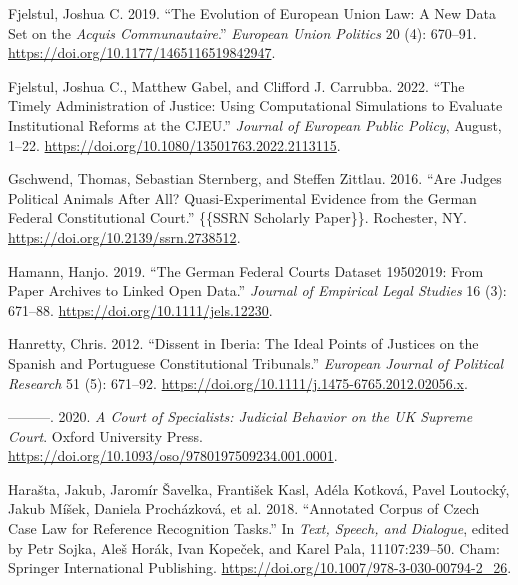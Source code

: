 \documentclass[
  11pt,
]{article}
\newlength{\cslhangindent}
\newenvironment{CSLReferences}[2] %
 {%
  \setlength{\parindent}{0pt}
  \ifodd #1 \everypar{\setlength{\hangindent}{\cslhangindent}}\ignorespaces\fi
  \ifnum #2 > 0
  \setlength{\parskip}{#2\baselineskip}
  \fi
 }%
 {}
\begin{document}
\begin{CSLReferences}{1}{0}
\leavevmode{}%
Fjelstul, Joshua C. 2019. {``The Evolution of {European Union} Law: {A}
New Data Set on the {\emph{Acquis Communautaire}}.''} \emph{European
Union Politics} 20 (4): 670--91.
\url{https://doi.org/10.1177/1465116519842947}.

\leavevmode{}%
Fjelstul, Joshua C., Matthew Gabel, and Clifford J. Carrubba. 2022.
{``The Timely Administration of Justice: Using Computational Simulations
to Evaluate Institutional Reforms at the {CJEU}.''} \emph{Journal of
European Public Policy}, August, 1--22.
\url{https://doi.org/10.1080/13501763.2022.2113115}.

\leavevmode{}%
Gschwend, Thomas, Sebastian Sternberg, and Steffen Zittlau. 2016. {``Are
{Judges Political Animals} After {All}? {Quasi-Experimental Evidence}
from the {German Federal Constitutional Court}.''} \{\{SSRN Scholarly
Paper\}\}. {Rochester, NY}. \url{https://doi.org/10.2139/ssrn.2738512}.

\leavevmode{}%
Hamann, Hanjo. 2019. {``The {German Federal Courts Dataset}
1950{\textendash}2019: {From Paper Archives} to {Linked Open Data}.''}
\emph{Journal of Empirical Legal Studies} 16 (3): 671--88.
\url{https://doi.org/10.1111/jels.12230}.

\leavevmode{}%
Hanretty, Chris. 2012. {``Dissent in {Iberia}: {The} Ideal Points of
Justices on the {Spanish} and {Portuguese Constitutional Tribunals}.''}
\emph{European Journal of Political Research} 51 (5): 671--92.
\url{https://doi.org/10.1111/j.1475-6765.2012.02056.x}.

\leavevmode{}%
---------. 2020. \emph{A {Court} of {Specialists}: {Judicial Behavior}
on the {UK Supreme Court}}. {Oxford University Press}.
\url{https://doi.org/10.1093/oso/9780197509234.001.0001}.

\leavevmode{}%
Harašta, Jakub, Jaromír Šavelka, František Kasl, Adéla Kotková, Pavel
Loutocký, Jakub Míšek, Daniela Procházková, et al. 2018. {``Annotated
{Corpus} of {Czech Case Law} for {Reference Recognition Tasks}.''} In
\emph{Text, {Speech}, and {Dialogue}}, edited by Petr Sojka, Aleš Horák,
Ivan Kopeček, and Karel Pala, 11107:239--50. {Cham}: {Springer
International Publishing}.
\url{https://doi.org/10.1007/978-3-030-00794-2_26}.


\end{CSLReferences}
\end{document}
